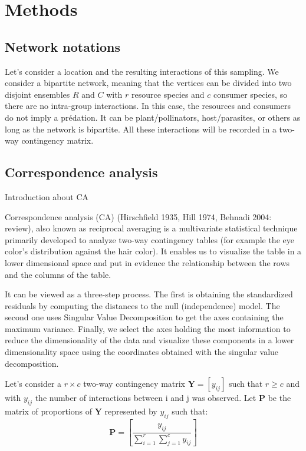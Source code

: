 \section{Methods}

\subsection{Network notations}
Let's consider a location and the resulting interactions of this sampling. We consider a bipartite network, meaning that the vertices can be divided into two disjoint ensembles $R$ and $C$ with $r$ resource species and $c$ consumer species, so there are no intra-group interactions. In this case, the resources and consumers do not imply a prédation. It can be plant/pollinators, host/parasites, or others as long as the network is bipartite.  All these interactions will be recorded in a two-way contingency matrix.





\subsection{Correspondence analysis}

Introduction about CA

Correspondence analysis (CA) (Hirschfield 1935, Hill 1974, Behnadi 2004: review), also known as reciprocal averaging is a multivariate statistical technique  primarily developed to analyze two-way contingency tables (for example the eye color's distribution against the hair color). It enables us to visualize the table in a lower dimensional space and put in evidence the relationship between the rows and the columns of the table.

It can be viewed as a three-step process. The first is obtaining the standardized residuals by computing the distances to the null (independence) model. The second one uses Singular Value Decomposition to get the axes containing the maximum variance. Finally, we select the axes holding the most information to reduce the dimensionality of the data and visualize these components in a lower dimensionality space using the coordinates obtained with the singular value decomposition.


Let's consider a $r \times c$ two-way contingency matrix $\mathbf{Y} = [y_{ij}]$ such that $r\geq c$ and with $y_{ij}$ the number of interactions between i and j was observed. Let $\mathbf{P}$ be the matrix of proportions of $\mathbf{Y}$ represented by $y_{ij}$ such that:
$$
\mathbf{P} = \left[ \frac{y_{ij}}{\sum_{i=1}^{r} \sum_{j=1}^{c} y_{ij}} \right]
$$

